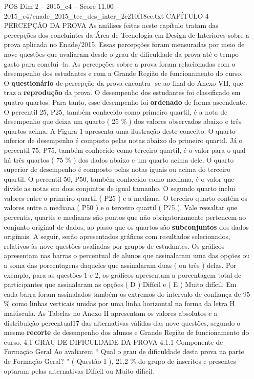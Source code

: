 \begin{textsample}{POS Dim 2 – 2015\_c4 – Score 11.00 – 2015\_c4/enade\_2015\_tec\_des\_inter\_2e210f18ec.txt}  \label{ex:f2_pos_088}
CAPÍTULO 4 PERCEPÇÃO DA PROVA As análises feitas neste capítulo tratam das percepções dos concluintes da Área de Tecnologia em Design de Interiores sobre a prova aplicada no Enade/2015.
Essas percepções foram mensuradas por meio de nove questões que avaliaram desde o grau de dificuldade da prova até o tempo gasto para concluí -la.
As percepções sobre a prova foram relacionadas com o desempenho dos estudantes e com a Grande Região de funcionamento do curso.
O \textbf{questionário} de percepção da prova encontra -se ao final do Anexo VII, que traz a \textbf{reprodução} da prova.
O desempenho dos estudantes foi classificado em quatro quartos.
Para tanto, esse desempenho foi \textbf{ordenado} de forma ascendente.
O percentil 25, P25, também conhecido como primeiro quartil, é a nota de desempenho que deixa um quarto ( 25 \% ) dos valores observados abaixo e três quartos acima.
A Figura 1 apresenta uma ilustração deste conceito.
O quarto inferior de desempenho é composto pelas notas abaixo do primeiro quartil.
Já o percentil 75, P75, também conhecido como terceiro quartil, é o valor para o qual há três quartos ( 75 \% ) dos dados abaixo e um quarto acima dele.
O quarto superior de desempenho é composto pelas notas iguais ou acima do terceiro quartil.
O percentil 50, P50, também conhecido como mediana, é o valor que divide as notas em dois conjuntos de igual tamanho.
O segundo quarto inclui valores entre o primeiro quartil ( P25 ) e a mediana.
O terceiro quarto contém os valores entre a mediana ( P50 ) e o terceiro quartil ( P75 ).
Vale ressaltar que percentis, quartis e medianas são pontos que não obrigatoriamente pertencem ao conjunto original de dados, ao passo que os quartos são \textbf{subconjuntos} dos dados originais.
A seguir, serão apresentados gráficos com resultados selecionados, relativos às nove questões avaliadas por grupos de estudantes.
Os gráficos apresentam nas barras o percentual de alunos que assinalaram uma das opções ou a soma das porcentagens daqueles que assinalaram duas ( ou três ) delas.
Por exemplo, para as questões 1 e 2, os gráficos apresentam a porcentagem total de participantes que assinalaram as opções ( D ) Difícil e ( E ) Muito difícil.
Em cada barra foram assinalados também os extremos do intervalo de confiança de 95 \% como linhas verticais unidas por uma linha horizontal na forma da letra H maiúscula.
As Tabelas no Anexo II apresentam os valores absolutos e a distribuição percentual17 das alternativas válidas das nove questões, segundo o mesmo \textbf{recorte} de desempenho dos alunos e Grande Região de funcionamento do curso. 4.1 GRAU DE DIFICULDADE DA PROVA 4.1.1 Componente de Formação Geral Ao avaliarem “ Qual o grau de dificuldade desta prova na parte de Formação Geral? ” ( Questão 1 ), 21,2 \% do grupo de inscritos e presentes optaram pelas alternativas Difícil ou Muito difícil.

\end{textsample}
